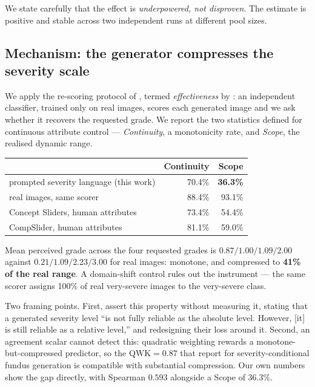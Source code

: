 \documentclass[11pt]{article}
\begin{document}
We state carefully that the effect is \emph{underpowered, not disproven}. The estimate is
positive and stable across two independent runs at different pool sizes.

\subsection{Mechanism: the generator compresses the severity scale}

We apply the re-scoring protocol of \citet{shen2020}, termed \emph{effectiveness} by
\citet{monteiro2023}: an independent classifier, trained only on real images, scores each
generated image and we ask whether it recovers the requested grade. We report the two
statistics defined for continuous attribute control --- \emph{Continuity}, a monotonicity
rate, and \emph{Scope}, the realised dynamic range.

\begin{center}
\begin{tabular}{lrr}
\toprule
& Continuity & Scope \\
\midrule
prompted severity language (this work) & 70.4\% & \textbf{36.3\%} \\
real images, same scorer & 88.4\% & 93.1\% \\
Concept Sliders, human attributes & 73.4\% & 54.4\% \\
CompSlider, human attributes & 81.1\% & 59.0\% \\
\bottomrule
\end{tabular}
\end{center}

Mean perceived grade across the four requested grades is $0.87 / 1.00 / 1.09 / 2.00$ against
$0.21 / 1.09 / 2.23 / 3.00$ for real images: monotone, and compressed to \textbf{41\% of the
real range}. A domain-shift control rules out the instrument --- the same scorer assigns
100\% of real very-severe images to the very-severe class.

Two framing points. First, \citet{takezaki2023} assert this property without measuring it,
stating that a generated severity level ``is not fully reliable as the absolute level.
However, [it] is still reliable as a relative level,'' and redesigning their loss around it.
Second, an agreement scalar cannot detect this: quadratic weighting rewards a
monotone-but-compressed predictor, so the $\mathrm{QWK}=0.87$ that \citet{schmidt2026}
report for severity-conditional fundus generation is compatible with substantial
compression. Our own numbers show the gap directly, with Spearman $0.593$ alongside a Scope
of $36.3\%$.
\end{document}
